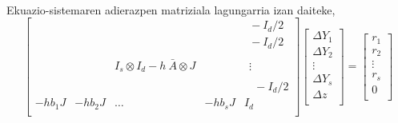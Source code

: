 \paragraph*{} Ekuazio-sistemaren adierazpen matriziala lagungarria izan daiteke,
\begin{equation*}
\begin{bmatrix}
    &      &      &  & \ \ -I_d/2 \\
    &      &      &  & \ \ -I_d/2 \\
    &      &      &  & \ \      \\    
    &  & I_s \otimes I_d- h \ \bar{A} \otimes J & & \ \ \vdots \\
    &      &      &  & \ \      \\
    &      &      &  & \ \ \ \ -I_d/2    \\
-hb_1 J & -hb_2 J & \dots & -hb_s J &  I_d\\ 
\end{bmatrix}
\begin{bmatrix}
\Delta Y_1 \\
\Delta Y_2 \\
\vdots \\
\Delta Y_s \\
\Delta z\\
\end{bmatrix}=
\begin{bmatrix}
r_1 \\
r_2 \\
\vdots \\
r_s \\
0\\
\end{bmatrix}
\end{equation*} 

